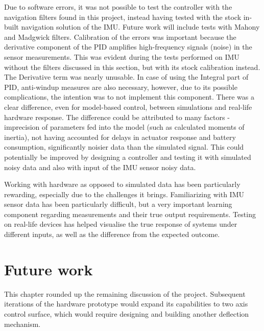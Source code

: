 Due to software errors, it was not possible to test the controller with the navigation filters found in this project, instead having tested with the stock in-built navigation solution of the IMU. Future work will include tests with Mahony and Madgwick filters.   
Calibration of the errors was important because the derivative component of the PID amplifies high-frequency signals (noise) in the sensor measurements.
This was evident during the tests performed on IMU without the filters discussed in this section, but with its stock calibration instead. The Derivative term was nearly unusable. 
In case of using the Integral part of PID, anti-windup measures are also necessary, however, due to its possible complications, the intention was to not implement this component. 
There was a clear difference, even for model-based control, between simulations and real-life hardware response. The difference could be attributed to many factors - imprecision of parameters fed into the model (such as calculated moments of inertia), not having accounted for delays in actuator response and battery consumption, significantly noisier data than the simulated signal. This could potentially be improved by designing a controller and testing it with simulated noisy data and also with input of the IMU sensor noisy data. 

Working with hardware as opposed to simulated data has been particularly rewarding, especially due to the challenges it brings. Familiarizing with IMU sensor data has been particularly difficult, but a very important learning component regarding measurements and their true output requirements. Testing on real-life devices has helped visualise the true response of systems under different inputs, as well as the difference from the expected outcome.



\section{Future work}

This chapter rounded up the remaining discussion of the project.
Subsequent iterations of the hardware prototype would expand its capabilities to two axis control surface, which would require designing and building another deflection mechanism.

